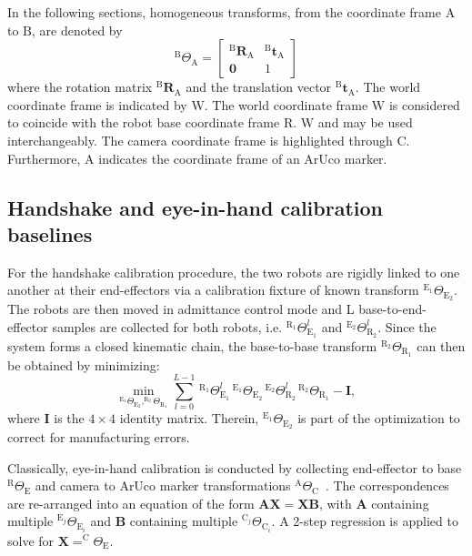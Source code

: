 In the following sections, homogeneous transforms, from the coordinate frame $\text{A}$ to $\text{B}$, are denoted by $$^\text{B}\Theta_\text{A}=\begin{bmatrix} ^\text{B}\mathbf{R}_\text{A} & ^\text{B}\textbf{t}_\text{A} \\ \mathbf{0} & 1 \end{bmatrix}$$ where the rotation matrix $^\text{B}\mathbf{R}_\text{A}$ and the translation vector $^\text{B}\textbf{t}_\text{A}$. The world coordinate frame is indicated by $\text{W}$. The world coordinate frame $\text{W}$ is considered to coincide with the robot base coordinate frame $\text{R}$. $\text{W}$ and  may be used interchangeably. The camera coordinate frame is highlighted through $\text{C}$. Furthermore, $\text{A}$ indicates the coordinate frame of an ArUco marker.

\subsection{Handshake and eye-in-hand calibration baselines}
\label{c1:sec:handshake_and_eye_in_hand_calibration}
For the handshake calibration procedure, the two robots are rigidly linked to one another at their end-effectors via a calibration fixture of known transform $^{\text{E}_1}\Theta_{\text{E}_2}$. The robots are then moved in admittance control mode and L base-to-end-effector samples are collected for both robots, i.e. $^{\text{R}_1}\Theta^l_{\text{E}_1}$ and $^{\text{E}_2}\Theta^l_{\text{R}_2}$. Since the system forms a closed kinematic chain, the base-to-base transform $^{\text{R}_2}\Theta_{\text{R}_1}$ can then be obtained by minimizing:
%
\begin{equation}
    \label{c1:eq:handsake}
    \min_{^{\text{E}_1}\Theta_{\text{E}_2}, ^{\text{R}_2}\Theta_{\text{R}_1}} \sum_{l=0}^{L-1}\,^{\text{R}_1}\Theta^l_{\text{E}_1}\,^{\text{E}_1}\Theta_{\text{E}_2}\,^{\text{E}_2}\Theta^l_{\text{R}_2}\,^{\text{R}_2}\Theta_{\text{R}_1} - \mathbf{I},
\end{equation}
%
where $\mathbf{I}$ is the $4\times4$ identity matrix. Therein, $^{\text{E}_1}\Theta_{\text{E}_2}$ is part of the optimization to correct for manufacturing errors.

Classically, eye-in-hand calibration is conducted by collecting end-effector to base $^\text{R}\Theta_\text{E}$ and camera to ArUco marker transformations $^\text{A}\Theta_\text{C}$~\citep{eye_in_hand}. The correspondences are re-arranged into an equation of the form $\mathbf{A}\mathbf{X}=\mathbf{X}\mathbf{B}$, with $\mathbf{A}$ containing multiple $^{\text{E}_j}\Theta_{\text{E}_i}$ and $\mathbf{B}$ containing multiple $^{\text{C}_j}\Theta_{\text{C}_i}$. A 2-step regression is applied to solve for $\mathbf{X}=^\text{C}\Theta_\text{E}$.

